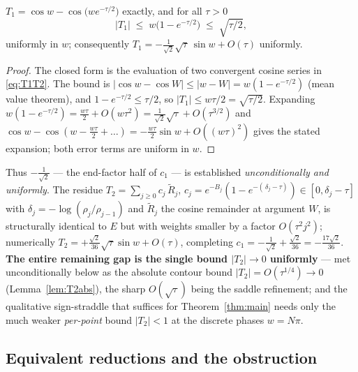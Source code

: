 \begin{proposition}\label{prop:T1}
$T_1=\cos w-\cos\!\bigl(w e^{-\tau/2}\bigr)$ exactly, and for all $\tau>0$
\[
  |T_1|\;\le\; w\bigl(1-e^{-\tau/2}\bigr)\;\le\;\sqrt{\tau/2},
\]
uniformly in $w$; consequently $T_1=-\tfrac1{\sqrt2}\sqrt\tau\,\sin w+O(\tau)$ uniformly.
\end{proposition}

\begin{proof}
The closed form is the evaluation of two convergent cosine series in \eqref{eq:T1T2}.
The bound is $|\cos w-\cos W|\le|w-W|=w(1-e^{-\tau/2})$ (mean value theorem), and
$1-e^{-\tau/2}\le\tau/2$, so $|T_1|\le w\tau/2=\sqrt{\tau/2}$. Expanding
$w(1-e^{-\tau/2})=\tfrac{w\tau}2+O(w\tau^2)=\tfrac1{\sqrt2}\sqrt\tau+O(\tau^{3/2})$ and
$\cos w-\cos(w-\tfrac{w\tau}2+\dots)=-\tfrac{w\tau}2\sin w+O((w\tau)^2)$ gives the stated
expansion; both error terms are uniform in $w$. \end{proof}

Thus $-\tfrac1{\sqrt2}$ --- the end-factor half of $c_1$ --- is established
\emph{unconditionally and uniformly}. The residue
$T_2=\sum_{j\ge0}c_j\,\widetilde R_j$, $c_j=e^{-B_j}(1-e^{-(\,\delta_j-\tau)})\in[0,\delta_j-\tau]$
with $\delta_j=-\log(\rho_j/\rho_{j-1})$ and $\widetilde R_j$ the cosine remainder at
argument $W$, is structurally identical to $E$ but with weights smaller by a factor
$O(\tau^2 j^2)$; numerically $T_2=+\tfrac{\sqrt2}{36}\sqrt\tau\sin w+O(\tau)$, completing
$c_1=-\tfrac1{\sqrt2}+\tfrac{\sqrt2}{36}=-\tfrac{17\sqrt2}{36}$. \textbf{The entire
remaining gap is the single bound $|T_2|\to0$ uniformly} --- met unconditionally below as the absolute contour
bound $|T_2|=O(\tau^{1/4})\to0$ (Lemma~\ref{lem:T2abs}), the sharp $O(\sqrt\tau)$ being the saddle refinement;
and the qualitative sign-straddle that suffices for Theorem~\ref{thm:main} needs only the much weaker
\emph{per-point} bound $|T_2|<1$ at the discrete phases $w=N\pi$.

\subsection{Equivalent reductions and the obstruction}
\label{ss:obstruction}

